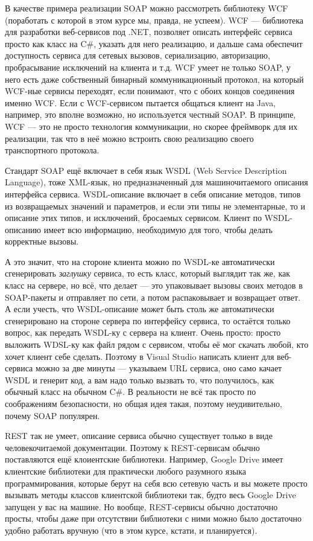 \documentclass[a5paper]{article}
\begin{document}
В качестве примера реализации SOAP можно рассмотреть библиотеку WCF (поработать с которой в этом курсе мы, правда, не успеем). WCF --- библиотека для разработки веб-сервисов под .NET, позволяет описать интерфейс сервиса просто как класс на C\#, указать для него реализацию, и дальше сама обеспечит доступность сервиса для сетевых вызовов, сериализацию, авторизацию, пробрасывание исключений на клиента и т.д. WCF умеет не только SOAP, у него есть даже собственный бинарный коммуникационный протокол, на который WCF-ные сервисы переходят, если понимают, что с обоих концов соединения именно WCF. Если с WCF-сервисом пытается общаться клиент на Java, например, это вполне возможно, но используется честный SOAP. В принципе, WCF --- это не просто технология коммуникации, но скорее фреймворк для их реализации, так что в неё можно встроить свою реализацию своего транспортного протокола.

Стандарт SOAP ещё включает в себя язык WSDL (Web Service Description Language), тоже XML-язык, но предназначенный для машиночитаемого описания интерфейса сервиса. WSDL-описание включает в себя описание методов, типов из возвращаемых значений и параметров, и если эти типы не элементарные, то и описание этих типов, и исключений, бросаемых сервисом. Клиент по WSDL-описанию имеет всю информацию, необходимую для того, чтобы делать корректные вызовы. 

А это значит, что на стороне клиента можно по WSDL-ке автоматически сгенерировать \textit{заглушку} сервиса, то есть класс, который выглядит так же, как класс на сервере, но всё, что делает --- это упаковывает вызовы своих методов в SOAP-пакеты и отправляет по сети, а потом распаковывает и возвращает ответ. А если учесть, что WSDL-описание может быть столь же автоматически сгенерировано на стороне сервера по интерфейсу сервиса, то остаётся только вопрос, как передать WSDL-ку с сервера на клиент. Очень просто: просто выложить WDSL-ку как файл рядом с сервисом, чтобы её мог скачать любой, кто хочет клиент себе сделать. Поэтому в Visual Studio написать клиент для веб-сервиса можно за две минуты --- указываем URL сервиса, оно само качает WSDL и генерит код, а вам надо только вызвать то, что получилось, как обычный класс на обычном C\#. В реальности не всё так просто по соображениям безопасности, но общая идея такая, поэтому неудивительно, почему SOAP популярен.

REST так не умеет, описание сервиса обычно существует только в виде человекочитаемой документации. Поэтому к REST-сервисам обычно поставляются ещё клоиентские библиотеки. Например, Google Drive имеет клиентские библиотеки для практически любого разумного языка программирования, которые берут на себя всю сетевую часть и вы можете просто вызывать методы классов клиентской библиотеки так, будто весь Google Drive запущен у вас на машине. Но вообще, REST-сервисы обычно достаточно просты, чтобы даже при отсутствии библиотеки с ними можно было достаточно удобно работать вручную (что в этом курсе, кстати, и планируется).
\end{document}
